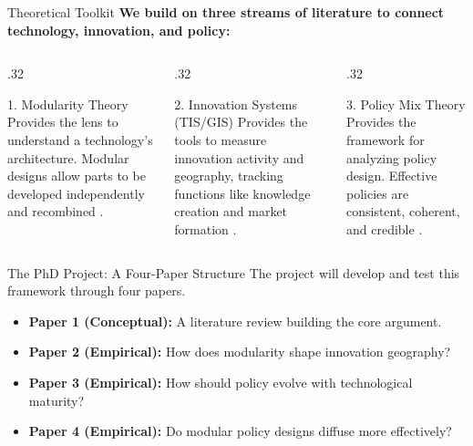 \documentclass[10pt, aspectratio=169]{beamer}
\begin{document}
\begin{frame}{Theoretical Toolkit}
    \textbf{We build on three streams of literature to connect technology, innovation, and policy:}
    
    \vfill
    
    \begin{columns}[T]
        \begin{column}{.32\textwidth}
            \begin{block}{\textcolor{aauDarkBlue}{1. Modularity Theory}}
                Provides the lens to understand a technology's architecture. Modular designs allow parts to be developed independently and recombined \parencite{baldwin2000design}.
            \end{block}
        \end{column}
        
        \begin{column}{.32\textwidth}
            \begin{block}{\textcolor{aauDarkGreen}{2. Innovation Systems (TIS/GIS)}}
                Provides the tools to measure innovation activity and geography, tracking functions like knowledge creation and market formation \parencite{hekkert2007functions, binz2017global}.
            \end{block}
        \end{column}
        
        \begin{column}{.32\textwidth}
            \begin{block}{\textcolor{aauDarkOrange}{3. Policy Mix Theory}}
                Provides the framework for analyzing policy design. Effective policies are consistent, coherent, and credible \parencite{rogge2016policy}.
            \end{block}
        \end{column}
    \end{columns}
    
    \vfill
\end{frame}

\begin{frame}{The PhD Project: A Four-Paper Structure}
    The project will develop and test this framework through four papers.

    \vspace{1cm}
    
    \begin{itemize}
        \item \textbf{Paper 1 (Conceptual):} A literature review building the core argument.
        \pause
        \item \textbf{\textcolor{aauDarkGreen}{Paper 2 (Empirical):}} How does modularity shape innovation \alert{geography}?
        \pause
        \item \textbf{\textcolor{aauDarkOrange}{Paper 3 (Empirical):}} How should policy \alert{evolve} with technological maturity?
        \pause
        \item \textbf{\textcolor{aauDarkGold}{Paper 4 (Empirical):}} Do modular \alert{policy designs} diffuse more effectively?
    \end{itemize}
\end{frame}
\end{document}
